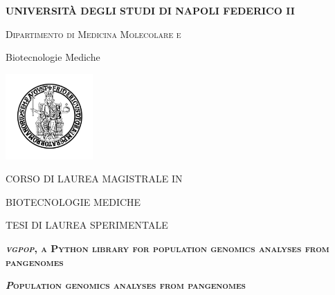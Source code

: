 \documentclass[
11pt, %
oneside, %
english, %
singlespacing, %
headsepline, %
chapterinoneline, %
]{MastersDoctoralThesis} %
\author{Flavia Villani, Vincenza Colonna}
\date{1 June 2020}
\begin{document}
\begin{titlepage}
\centering
{\scshape\large\normalfont\bfseries UNIVERSITÀ DEGLI STUDI DI NAPOLI FEDERICO II \par}
 \vspace{0.7cm} 
{\scshape\large\normalfont Dipartimento di Medicina Molecolare e 

Biotecnologie Mediche
 \vspace{0.7cm} 
 
 
 \includegraphics[width=0.25\textwidth]{fig/logo.png}
 \par
 \vspace{0.5cm}
\hspace{2cm}
 \par}
 \vspace{0.2cm}
{\scshape\large\normalfont CORSO DI LAUREA MAGISTRALE IN 

BIOTECNOLOGIE MEDICHE
 \par}
 \vspace{0.5cm} 
{\scshape\large\normalfont TESI DI LAUREA SPERIMENTALE
 \par}
  \vspace{0.5cm}
{\scshape\large\normalfont\bfseries\textit \textit{vgpop}, a Python library for population genomics analyses from pangenomes
 \par}  

{\scshape\large\normalfont\bfseries\textit Population genomics analyses from pangenomes
 \par}  



\end{titlepage}
\end{document}
